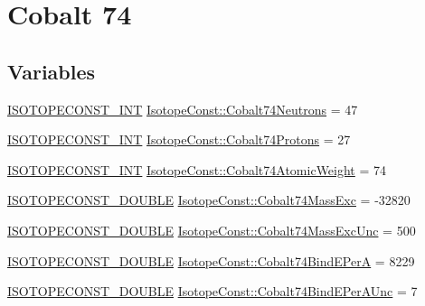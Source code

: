 \hypertarget{group___isotope_const-_cobalt-_co74}{}\section{Cobalt 74}
\label{group___isotope_const-_cobalt-_co74}
\subsection*{Variables}
\begin{DoxyCompactItemize}
\item 
\mbox{\hyperlink{group___isotope_const-_macros_ga5f18360b3e99483a35c32d789e62621c}{I\+S\+O\+T\+O\+P\+E\+C\+O\+N\+S\+T\+\_\+\+I\+NT}} \mbox{\hyperlink{group___isotope_const-_cobalt-_co74_gaff1ea788891bf7f8b29432ef6ec655a8}{Isotope\+Const\+::\+Cobalt74\+Neutrons}} = 47
\item 
\mbox{\hyperlink{group___isotope_const-_macros_ga5f18360b3e99483a35c32d789e62621c}{I\+S\+O\+T\+O\+P\+E\+C\+O\+N\+S\+T\+\_\+\+I\+NT}} \mbox{\hyperlink{group___isotope_const-_cobalt-_co74_gabecc326c4ad1ab84e7f587b30f109bea}{Isotope\+Const\+::\+Cobalt74\+Protons}} = 27
\item 
\mbox{\hyperlink{group___isotope_const-_macros_ga5f18360b3e99483a35c32d789e62621c}{I\+S\+O\+T\+O\+P\+E\+C\+O\+N\+S\+T\+\_\+\+I\+NT}} \mbox{\hyperlink{group___isotope_const-_cobalt-_co74_gab78d5707a5bb6652a98d4e4ccbe3a71e}{Isotope\+Const\+::\+Cobalt74\+Atomic\+Weight}} = 74
\item 
\mbox{\hyperlink{group___isotope_const-_macros_ga8f45a7272ce02c0b4c65c44636ed719a}{I\+S\+O\+T\+O\+P\+E\+C\+O\+N\+S\+T\+\_\+\+D\+O\+U\+B\+LE}} \mbox{\hyperlink{group___isotope_const-_cobalt-_co74_gac21dc726ddc497ac2e86a0a189a11c3d}{Isotope\+Const\+::\+Cobalt74\+Mass\+Exc}} = -\/32820
\item 
\mbox{\hyperlink{group___isotope_const-_macros_ga8f45a7272ce02c0b4c65c44636ed719a}{I\+S\+O\+T\+O\+P\+E\+C\+O\+N\+S\+T\+\_\+\+D\+O\+U\+B\+LE}} \mbox{\hyperlink{group___isotope_const-_cobalt-_co74_ga020f15bef790253772c161a79a3a8432}{Isotope\+Const\+::\+Cobalt74\+Mass\+Exc\+Unc}} = 500
\item 
\mbox{\hyperlink{group___isotope_const-_macros_ga8f45a7272ce02c0b4c65c44636ed719a}{I\+S\+O\+T\+O\+P\+E\+C\+O\+N\+S\+T\+\_\+\+D\+O\+U\+B\+LE}} \mbox{\hyperlink{group___isotope_const-_cobalt-_co74_ga44184534d104fbcc7371c65c0b92352a}{Isotope\+Const\+::\+Cobalt74\+Bind\+E\+PerA}} = 8229
\item 
\mbox{\hyperlink{group___isotope_const-_macros_ga8f45a7272ce02c0b4c65c44636ed719a}{I\+S\+O\+T\+O\+P\+E\+C\+O\+N\+S\+T\+\_\+\+D\+O\+U\+B\+LE}} \mbox{\hyperlink{group___isotope_const-_cobalt-_co74_ga5351a51d3e96e52ecc1d9ec928ad98c2}{Isotope\+Const\+::\+Cobalt74\+Bind\+E\+Per\+A\+Unc}} = 7

\end{DoxyCompactItemize}
